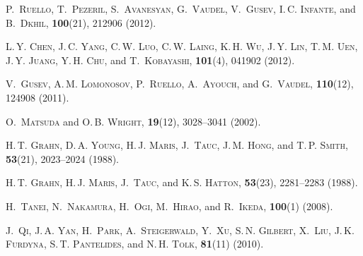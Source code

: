 \documentclass[pss]{wiley2sp} %
\begin{document}
\begin{thebibliography}{[10]}
 \textsc{P.~Ruello},  \textsc{T.~Pezeril},  \textsc{S.~Avanesyan},
  \textsc{G.~Vaudel},  \textsc{V.~Gusev},  \textsc{I.\,C. Infante},  and
  \textsc{B.~Dkhil},
  \textbf{100}(21), 212906 (2012).


 \textsc{L.\,Y. Chen},  \textsc{J.\,C. Yang},  \textsc{C.\,W. Luo},
  \textsc{C.\,W. Laing},  \textsc{K.\,H. Wu},  \textsc{J.\,Y. Lin},
  \textsc{T.\,M. Uen},  \textsc{J.\,Y. Juang},  \textsc{Y.\,H. Chu},  and
  \textsc{T.~Kobayashi},
  \textbf{101}(4), 041902 (2012).


 \textsc{V.~Gusev},  \textsc{A.\,M. Lomonosov},  \textsc{P.~Ruello},
  \textsc{A.~Ayouch},  and  \textsc{G.~Vaudel},
  \textbf{110}(12), 124908 (2011).


 \textsc{O.~Matsuda} and  \textsc{O.\,B. Wright},
  \textbf{19}(12), 3028--3041 (2002).


 \textsc{H.\,T. Grahn},  \textsc{D.\,A. Young},  \textsc{H.\,J. Maris},
  \textsc{J.~Tauc},  \textsc{J.\,M. Hong},  and  \textsc{T.\,P. Smith},
  \textbf{53}(21), 2023--2024 (1988).


 \textsc{H.\,T. Grahn},  \textsc{H.\,J. Maris},  \textsc{J.~Tauc},  and
  \textsc{K.\,S. Hatton},
  \textbf{53}(23), 2281--2283 (1988).


 \textsc{H.~Tanei},  \textsc{N.~Nakamura},  \textsc{H.~Ogi},
  \textsc{M.~Hirao},  and  \textsc{R.~Ikeda},
  \textbf{100}(1) (2008).


 \textsc{J.~Qi},  \textsc{J.\,A. Yan},  \textsc{H.~Park},
  \textsc{A.~Steigerwald},  \textsc{Y.~Xu},  \textsc{S.\,N. Gilbert},
  \textsc{X.~Liu},  \textsc{J.\,K. Furdyna},  \textsc{S.\,T. Pantelides},  and
  \textsc{N.\,H. Tolk},
  \textbf{81}(11) (2010).



\end{thebibliography}
\end{document}
